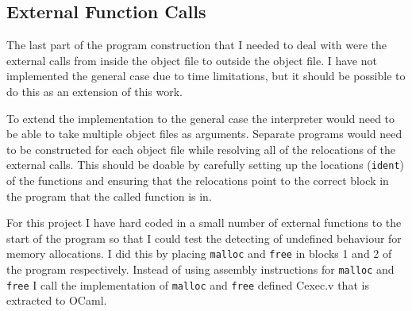 \subsection{External Function Calls}

The last part of the program construction that I needed to deal with were the external calls from inside the object file to outside the object file. I have not implemented the general case due to time limitations, but it should be possible to do this as  an extension of this work.

To extend the implementation to the general case the interpreter would need to be able to take multiple object files as arguments. Separate programs would need to be constructed for each object file while resolving all of the relocations of the external calls. This should be doable by carefully setting up the locations (\texttt{ident}) of the functions and ensuring that the relocations point to the correct block in the program that the called function is in.

For this project I have hard coded in a small number of external functions to the start of the program so that I could test the detecting of undefined behaviour for memory allocations. I did this by placing \texttt{malloc} and \texttt{free} in blocks 1 and 2 of the program respectively. Instead of using assembly instructions for \texttt{malloc} and \texttt{free} I call the implementation of \texttt{malloc} and \texttt{free} defined Cexec.v that is extracted to OCaml.
